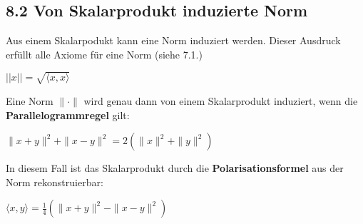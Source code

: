 \subsection{8.2 Von Skalarprodukt induzierte Norm}{
\vskip1pt
Aus einem Skalarpodukt kann eine Norm induziert werden. Dieser Ausdruck erfüllt alle Axiome für eine Norm (siehe 7.1.)
\vskip2pt
\begin{center}
$||x|| = \sqrt{\langle x, x \rangle}$
\end{center}

Eine Norm $\| \cdot \|$ wird genau dann von einem Skalarprodukt induziert, wenn die \textbf{Parallelogrammregel} gilt:
\vskip2pt
\begin{center}
$\|x + y \|^2 + \|x - y \|^2 = 2(\|x\|^2 + \|y\|^2)$
\end{center}

In diesem Fall ist das Skalarprodukt durch die \textbf{Polarisationsformel} aus der Norm rekonstruierbar:
\vskip2pt
\begin{center}
$\langle x,y \rangle = \frac{1}{4}(\|x + y \|^2 - \|x - y \|^2)$
\end{center}

}
\WhiteSpace